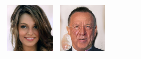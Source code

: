 \documentclass{article}
\newcommand{\pganw}{0.95in}
\begin{document}
\begin{table}[htbp]
\begin{center}
\begin{tabular}{cc|cc|cc}
\includegraphics[width=\pganw]{figures/pgan/61_base_iso_reject.jpg} &
\includegraphics[width=\pganw]{figures/pgan/60_base_iso_MH.jpg} &

\end{tabular}
\end{center}
\end{table}
\end{document}
